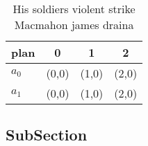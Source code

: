 \documentclass[a4paper]{article}
\begin{document}
\begin{table}
\begin{adjustbox}{width=0.6\columnwidth}
\begin{tabular}{|l|l|l|l|}
\hline
\textbf{plan} & \multicolumn{1}{c|}{\textbf{0}} & \multicolumn{1}{c|}{\textbf{1}} & \multicolumn{1}{c|}{\textbf{2}} \\ \hline
\textbf{$a_0$}  & (0,0) & (1,0) & (2,0) \\ \hline
\textbf{$a_1$}  & (0,0) & (1,0) & (2,0) \\ \hline
\end{tabular}
\end{adjustbox}
\caption{His soldiers violent strike Macmahon james draina
}
\end{table}

\subsection{SubSection}
\end{document}
